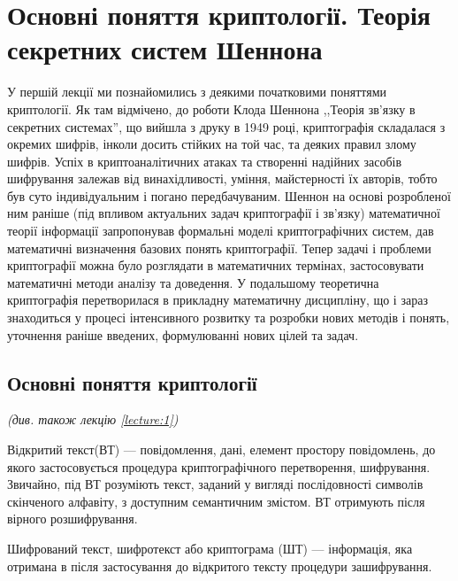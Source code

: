 \chapter{Основні поняття криптології. Теорія секретних систем Шеннона}

У першій лекції ми познайомились з деякими початковими поняттями криптології. Як
там відмічено, до роботи Клода Шеннона ,,Теорія зв'язку в
секретних системах'', що вийшла з друку в 1949 році, криптографія складалася з 
окремих шифрів, інколи досить стійких на той час, та деяких правил злому
шифрів. Успіх в криптоаналітичних атаках та створенні надійних засобів
шифрування  залежав від винахідливості, уміння, майстерності їх авторів, тобто
був суто індивідуальним і погано передбачуваним. Шеннон на основі розробленої
ним раніше (під впливом актуальних задач криптографії і зв’язку) математичної
теорії інформації запропонував формальні моделі криптографічних систем, дав
математичні визначення базових понять криптографії. Тепер задачі і проблеми
криптографії можна було розглядати в математичних термінах, застосовувати
математичні методи аналізу та доведення. У подальшому теоретична криптографія 
перетворилася в прикладну математичну дисципліну, що і зараз знаходиться  у
процесі інтенсивного розвитку та розробки нових методів і понять, уточнення
раніше введених, формулюванні нових цілей та задач. 

\section{Основні поняття криптології}
{\centering\itshape (див. також лекцію \ref{lecture:1}) \par}

\begin{definition}
    Відкритий текст(ВТ) --- повідомлення, дані, елемент простору повідомлень,
    до якого застосовується процедура криптографічного перетворення, шифрування.
    Звичайно, під ВТ розуміють текст, заданий у вигляді послідовності символів
    скінченого алфавіту, з доступним семантичним змістом. ВТ
    отримують після вірного розшифрування.
\end{definition}

\begin{definition}
    Шифрований текст, шифротекст  або криптограма (ШТ) --- інформація, яка
    отримана в після застосування до відкритого тексту процедури зашифрування.
\end{definition}

